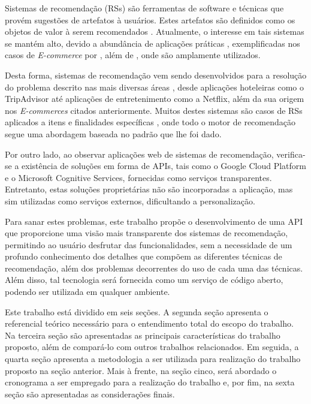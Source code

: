 \documentclass[12pt, openright, oneside, a4paper, brazil]{abntex2}
\begin{document}
Sistemas de recomendação (RSs) são ferramentas de  software e técnicas que provém sugestões de artefatos à usuários. Estes artefatos são definidos como os objetos de valor à serem recomendados \cite{ricci2011introduction}. Atualmente, o interesse em tais sistemas se mantém alto, devido a abundância de aplicações práticas \cite{adomavicius2005toward}, exemplificadas nos casos de \textit{E-commerce} por , além de , onde são amplamente utilizados.

Desta forma, sistemas de recomendação vem sendo desenvolvidos para a resolução do problema descrito nas mais diversas áreas \cite{bennett2007netflix, gavalas2014mobile}, desde aplicações hoteleiras como o TripAdvisor até aplicações de entretenimento como a Netflix, além da sua origem nos \textit{E-commerces} citados anteriormente. Muitos destes sistemas são casos de RSs aplicados a itens e finalidades específicas \cite{huang2002graph, brozovsky2007recommender}, onde todo o motor de recomendação segue uma abordagem baseada no padrão que lhe foi dado.

Por outro lado, ao observar aplicações web de sistemas de recomendação, verifica-se a existência de soluções em forma de APIs, tais como o Google Cloud Platform e o Microsoft Cognitive Services, fornecidas como serviços transparentes. Entretanto, estas soluções proprietárias não são incorporadas a aplicação, mas sim utilizadas como serviços externos, dificultando a personalização.

Para sanar estes problemas, este trabalho propõe o desenvolvimento de uma API que proporcione uma visão mais transparente dos sistemas de recomendação, permitindo ao usuário desfrutar das funcionalidades, sem a necessidade de um profundo conhecimento dos detalhes que compõem as diferentes técnicas de recomendação, além dos problemas decorrentes do uso de cada uma das técnicas. Além disso, tal tecnologia será fornecida como um serviço de código aberto, podendo ser utilizada em qualquer ambiente.

Este trabalho está dividido em seis seções. A segunda seção apresenta o referencial teórico necessário para o entendimento total do escopo do trabalho. Na terceira seção são apresentadas as principais características do trabalho proposto, além de compará-lo com outros trabalhos relacionados. Em seguida, a quarta seção apresenta a metodologia a ser utilizada para realização do trabalho proposto na seção anterior. Mais à frente, na seção cinco, será abordado o cronograma a ser empregado para a realização do trabalho e, por fim, na sexta seção são apresentadas as considerações finais.
\end{document}
